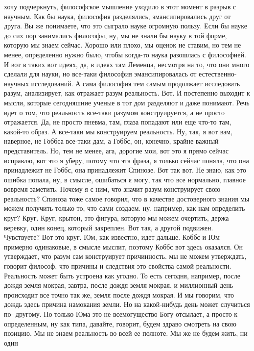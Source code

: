 хочу подчеркнуть, философское мышление уходило в этот момент в разрыв с научным.
Как бы наука, философия разделялись, эмансипировались друг от друга. Вы же
понимаете, что это сыграло науке огромную пользу. Если бы науке до сих пор
занимались философы, ну, мы не знали бы науку в той форме, которую мы знаем
сейчас. Хорошо или плохо, мы оценок не ставим, но тем не менее, определенно
нужно было, чтобы когда-то наука разошлась с философией. И вот в таких вот
идеях, да, в идеях там Леменца, несмотря на то, что они много сделали для науки,
но все-таки философия эмансипировалась от естественно-научных исследований. А
сама философия тем самым продолжает исследовать разум, анализирует, как отражает
разум реальность. Вот. И постепенно выходит к мысли, которые сегодняшние ученые
в тот дом разделяют и даже понимают. Речь идет о том, что реальность все-таки
разумом конструируется, а не просто отражается. Да, не просто пневма, там, глаза
попадают или еще что-то там, какой-то образ. А все-таки мы конструируем
реальность. Ну, так, я вот вам, наверное, не Гоббса все-таки дам, а Гоббс, он,
конечно, крайне важный представитель. Но, тем не менее, ага, дорогие мои, вот
это я прямо сейчас исправлю, вот это я уберу, потому что эта фраза, я только
сейчас поняла, что она принадлежит не Гоббс, она принадлежит Спинозе. Вот так
вот. Не знаю, как это ошибка попала, ну, в смысле, ошибаться я могу, так что все
нормально, главное вовремя заметить. Почему я с ним, что значит разум
конструирует свою реальность? Спиноза тоже самое говорил, что в качестве
достоверного знания мы можем получить только то, что сами создаем. ну, например,
как нам определить круг? Круг. Круг, крытон, это фигура, которую мы можем
очертить, держа веревку, один конец, который закреплен. Вот так, а другой
подвижен. Чувствуете? Вот это круг. Юм, как известно, идет дальше. Коббс и Юм
примерно одинаковые, в смысле мыслит, поэтому Коббс вот здесь оказался. Он
утверждает, что разум сам конструирует причинность. мы не можем утверждать,
говорит философ, что причины и следствия это свойства самой реальности.
Реальность может быть устроена как угодно. То есть сегодня, например, после
дождя земля мокрая, завтра, после дождя земля мокрая, и миллионный день
происходит все точно так же, земля после дождя мокрая. И мы говорим, что дождь
здесь причина намокания земли. Но на какой-нибудь день может случиться по-
другому. Но только Юма это не всемогущество Богу отсылает, а просто к
определенным, ну как типа, давайте, говорит, будем здраво смотреть на свою
позицию. Мы не знаем реальность во всей ее полноте. Мы же не будем жить, ни один
